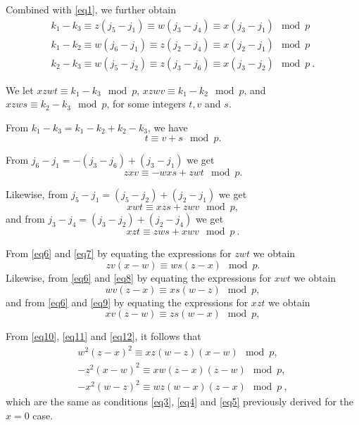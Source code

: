 Combined with \eqref{eq1}, we further obtain
\begin{equation}\begin{array}{ccc}
k_1 -k_3 \equiv z(j_5-j_1) \equiv w(j_3-j_4) \equiv x(j_3-j_1)
\mod p\\
k_1 -k_2 \equiv w(j_6-j_1) \equiv z(j_2-j_4) \equiv x(j_2-j_1)
\mod p\\
k_2 -k_3 \equiv w(j_5-j_2) \equiv z(j_3-j_6) \equiv x(j_3-j_2)
\mod p~.
\end{array}\end{equation}

We let $xzwt \equiv k_1-k_3 \mod p$, $xzwv \equiv k_1-k_2 \mod p$,
and $xzws \equiv k_2-k_3 \mod p$, for some integers $t,v$ and $s$.

From $k_1-k_3=k_1-k_2+k_2-k_3$, we have
\begin{equation}\label{eq6}
t \equiv v+s \mod p.
\end{equation}

From $j_6-j_1=-(j_3-j_6)+(j_3-j_1)$ we get
\begin{equation}\label{eq7}
zxv \equiv -wxs+zwt \mod p.
\end{equation}

Likewise, from $j_5-j_1=(j_5-j_2)+(j_2-j_1)$ we get
\begin{equation}\label{eq8}
xwt \equiv xzs+zwv \mod p,
\end{equation}
and from $j_3-j_4=(j_3-j_2)+(j_2-j_4)$ we get
\begin{equation}\label{eq9}
xzt \equiv zws+xwv \mod p~.
\end{equation}

From \eqref{eq6} and \eqref{eq7} by equating the expressions for
$zwt$ we obtain
\begin{equation}\label{eq10}
zv(x-w) \equiv ws(z-x) \mod p.
\end{equation}
Likewise, from \eqref{eq6} and \eqref{eq8} by equating the
expressions for $xwt$ we obtain
\begin{equation}\label{eq11}
wv(z-x) \equiv xs(w-z) \mod p, \end{equation} and from \eqref{eq6}
and \eqref{eq9} by equating the expressions for $xzt$ we obtain
\begin{equation}\label{eq12}
xv(z-w) \equiv zs(w-x) \mod p, \end{equation}

From \eqref{eq10}, \eqref{eq11} and \eqref{eq12}, it follows that
\begin{equation}
\begin{array}{ccc}
w^2(z-x)^2 \equiv xz(w-z)(x-w) \mod p,\\
-z^2(x-w)^2 \equiv xw(z-x)(z-w) \mod p,\\
-x^2(w-z)^2 \equiv wz(w-x)(z-x) \mod p~,
\end{array}\end{equation}
which are the same as conditions \eqref{eq3}, \eqref{eq4} and
\eqref{eq5} previously derived for the $x=0$ case.

